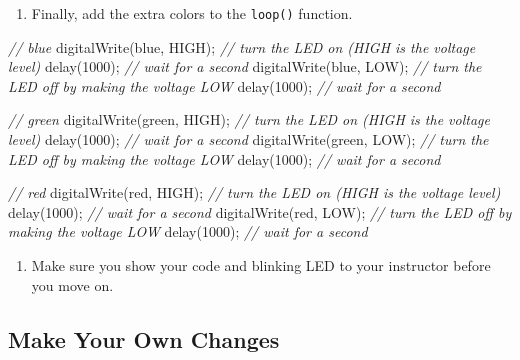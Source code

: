 \documentclass[]{book}
\newenvironment{Shaded}{\begin{snugshade}}{\end{snugshade}}
\newcommand{\CommentTok}[1]{\textcolor[rgb]{0.56,0.35,0.01}{\textit{#1}}}
\newcommand{\DecValTok}[1]{\textcolor[rgb]{0.00,0.00,0.81}{#1}}
\newcommand{\NormalTok}[1]{#1}
\providecommand{\tightlist}{%
  \setlength{\itemsep}{0pt}\setlength{\parskip}{0pt}}
\begin{document}
\begin{enumerate}
\def\labelenumi{\arabic{enumi}.}
\setcounter{enumi}{2}
\tightlist
\item
  Finally, add the extra colors to the \texttt{loop()} function.
\end{enumerate}

\begin{Shaded}
\begin{Highlighting}[]
  \CommentTok{// blue}
\NormalTok{  digitalWrite(blue, HIGH);   }\CommentTok{// turn the LED on (HIGH is the voltage level)}
\NormalTok{  delay(}\DecValTok{1000}\NormalTok{);                }\CommentTok{// wait for a second}
\NormalTok{  digitalWrite(blue, LOW);    }\CommentTok{// turn the LED off by making the voltage LOW}
\NormalTok{  delay(}\DecValTok{1000}\NormalTok{);                }\CommentTok{// wait for a second}
  
  \CommentTok{// green}
\NormalTok{  digitalWrite(green, HIGH);   }\CommentTok{// turn the LED on (HIGH is the voltage level)}
\NormalTok{  delay(}\DecValTok{1000}\NormalTok{);                 }\CommentTok{// wait for a second}
\NormalTok{  digitalWrite(green, LOW);    }\CommentTok{// turn the LED off by making the voltage LOW}
\NormalTok{  delay(}\DecValTok{1000}\NormalTok{);                 }\CommentTok{// wait for a second}
  
  \CommentTok{// red}
\NormalTok{  digitalWrite(red, HIGH);     }\CommentTok{// turn the LED on (HIGH is the voltage level)}
\NormalTok{  delay(}\DecValTok{1000}\NormalTok{);                 }\CommentTok{// wait for a second}
\NormalTok{  digitalWrite(red, LOW);      }\CommentTok{// turn the LED off by making the voltage LOW}
\NormalTok{  delay(}\DecValTok{1000}\NormalTok{);                 }\CommentTok{// wait for a second}
\end{Highlighting}
\end{Shaded}

\begin{enumerate}
\def\labelenumi{\arabic{enumi}.}
\setcounter{enumi}{3}
\tightlist
\item
  Make sure you show your code and blinking LED to your instructor before you move on.
\end{enumerate}

\hypertarget{make-your-own-changes}{%
\subsection{Make Your Own Changes}\label{make-your-own-changes}}
\end{document}
